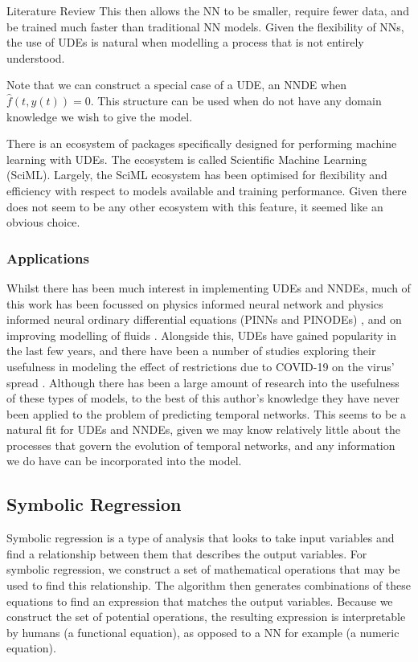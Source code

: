 \documentclass[12pt]{amsart}
\begin{document}
\begin{section}{Literature Review}
            This then allows the NN to be smaller, require fewer data, and be trained much faster than traditional NN models. Given the flexibility of NNs, the use of UDEs is natural when modelling a process that is not entirely understood\cite{kidger2022neural}.

            Note that we can construct a special case of a UDE, an NNDE when $\hat f(t,y(t))=0$. This structure can be used when do not have any domain knowledge we wish to give the model.
            
            There is an ecosystem of packages specifically designed for performing machine learning with UDEs. The ecosystem is called Scientific Machine Learning (SciML)\cite{SciML_C_Rak}. Largely, the SciML ecosystem has been optimised for flexibility and efficiency with respect to models available and training performance. Given there does not seem to be any other ecosystem with this feature, it seemed like 
            an obvious choice.
        
        \subsubsection{Applications}
            Whilst there has been much interest in implementing UDEs and NNDEs, much of this work has been focussed on physics informed neural network and physics informed neural ordinary differential equations (PINNs and PINODEs) \cite{karniadakis2021physics,GAO2021110079,krishnapriyan2021characterizing,roehrl2020modeling}, and on improving modelling of fluids \cite{mahmoudabadbozchelou2021data,nguyen2022physics}. Alongside this, UDEs have gained popularity in the last few years, and there have been a number of studies exploring their usefulness in modeling the effect of restrictions due to COVID-19 on the virus' spread \cite{Dandekar2020.04.03.20052084}. Although there has been a large amount of research into the usefulness of these types of models, to the best of this author's knowledge they have never been applied to the problem of predicting temporal networks. This seems to be a natural fit for UDEs and NNDEs, given we may know relatively little about the processes that govern the evolution of temporal networks, and any information we do have can be incorporated into the model.

    \subsection{Symbolic Regression}
        Symbolic regression is a type of analysis that looks to take input variables and find a relationship between them that describes the output variables. For symbolic regression, we construct a set of mathematical operations that may be used to find this relationship. The algorithm then generates combinations of these equations to find an expression that matches the output variables. Because we construct the set of potential operations, the resulting expression is interpretable by humans (a functional equation), as opposed to a NN for example (a numeric equation). 


\end{section}
\end{document}
